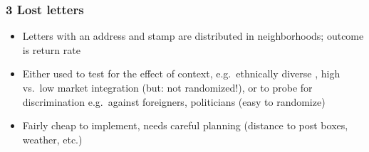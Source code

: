\documentclass[12pt,english,dvipsnames,aspectratio=169,handout]{beamer}\usepackage[]{graphicx}\usepackage[]{xcolor}
\begin{document}
\begin{frame}
	\frametitle{3 Lost letters}
	\footnotesize
\begin{itemize}
  \item Letters with an address and stamp are distributed in neighborhoods; outcome is return rate \cite{milgram_lostletter_1965}
  \item Either used to test for the effect of context, e.g.\ ethnically diverse \cite{koopmans_cooperation_2014}, high vs.\ low market integration (but: not randomized!), or to probe for discrimination e.g.\ against foreigners, politicians (easy to randomize)
  \item Fairly cheap to implement, needs careful planning (distance to post boxes, weather, etc.)
\end{itemize}
\vspace{3cm}
\end{frame}
\end{document}
